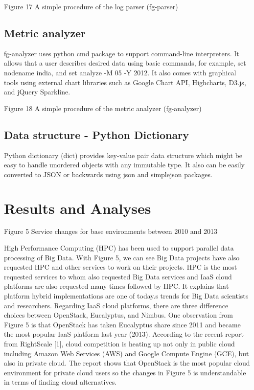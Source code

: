 \documentclass{sig-alternate}
\begin{document}
Figure 17 A simple procedure of the log parser (fg-parser)

\subsection{Metric analyzer}

fg-analyzer uses python cmd package to support command-line interpreters. It allows that a user describes desired data using basic commands, for example, set nodename india, and set analyze -M 05 -Y 2012. It also comes with graphical tools using external chart libraries such as Google Chart API, Highcharts, D3.js, and jQuery Sparkline.

Figure 18 A simple procedure of the metric analyzer (fg-analyzer)

\subsection{Data structure - Python Dictionary}

Python dictionary (dict) provides key-value pair data structure which might be easy to handle unordered objects with any immutable type. It also can be easily converted to JSON or backwards using json and simplejson packages.

\section{Results and Analyses} \label{S:result}

Figure 5 Service changes for base environments between 2010 and 2013

High Performance Computing (HPC) has been used to support parallel data processing of Big Data. With Figure 5, we can see Big Data projects have also requested HPC and other services to work on their projects. HPC is the most requested services to whom also requested Big Data services and IaaS cloud platforms are also requested many times followed by HPC. It explains that platform hybrid implementations are one of today.s trends for Big Data scientists and researchers. Regarding IaaS cloud platforms, there are three difference choices between OpenStack, Eucalyptus, and Nimbus. One observation from Figure 5 is that OpenStack has taken Eucalyptus share since 2011 and became the most popular IaaS platform last year (2013). According to the recent report from RightScale [1], cloud competition is heating up not only in public cloud including Amazon Web Services (AWS) and Google Compute Engine (GCE), but also in private cloud. The report shows that OpenStack is the most popular cloud environment for private cloud users so the changes in Figure 5 is understandable in terms of finding cloud alternatives.
\end{document}
